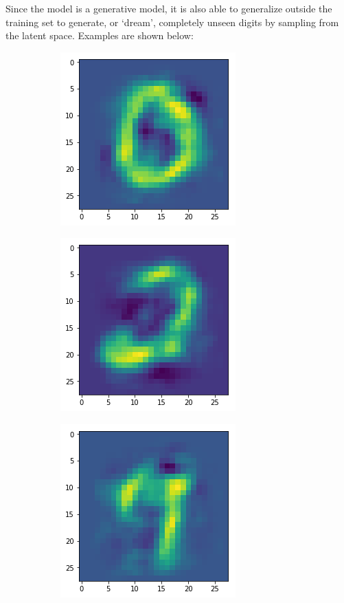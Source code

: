 Since the model is a generative model, it is also able to generalize outside the training set to generate, or `dream', completely unseen digits by sampling from the latent space. Examples are shown below:

\begin{figure}[htb]
\centering
\begin{subfigure}{.3\linewidth}
    \centering
    \includegraphics[scale=0.4]{chapter_3_figures/test_test_0.png}
\end{subfigure}
    \hfill
\begin{subfigure}{.3\linewidth}
    \centering
    \includegraphics[scale=0.4]{chapter_3_figures/test_test_2.png}
\end{subfigure}
   \hfill
\begin{subfigure}{.3\linewidth}
    \centering
    \includegraphics[scale=0.4]{chapter_3_figures/test_test_7.png}

\end{subfigure}
\end{figure}
